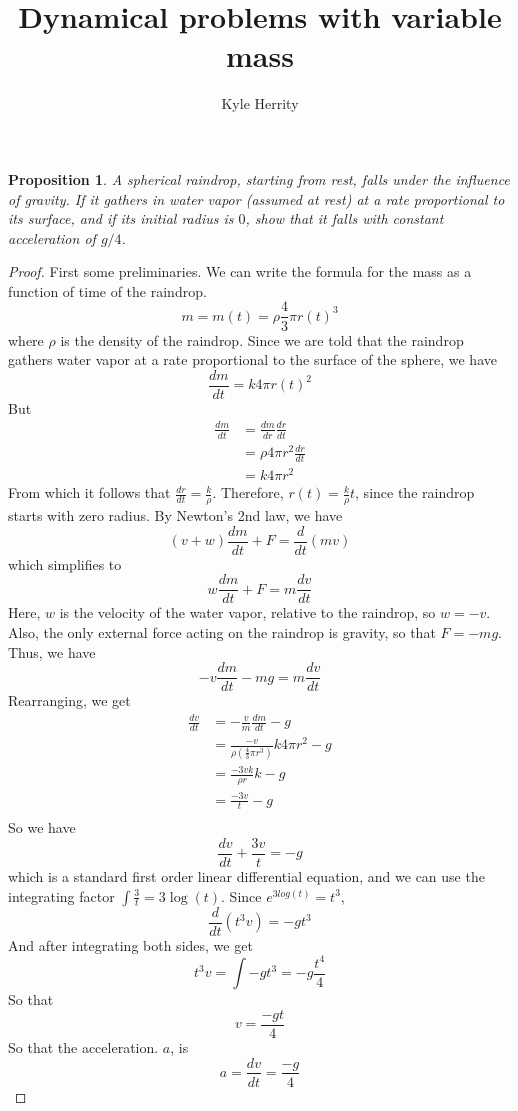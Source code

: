 \documentclass[11pt]{article}
\theoremstyle{plain}
\newtheorem{proposition}{Proposition}
\theoremstyle{definition}
\begin{document}
 
\title{Dynamical problems with variable mass}
\author{Kyle Herrity}
\maketitle

\begin{proposition}
 A spherical raindrop, starting from rest, falls under the influence of gravity. If it gathers in water vapor (assumed at rest) at a rate proportional to its surface, and if its initial radius is $0$, show that it falls with constant acceleration of $g/4$.
\end{proposition}
\begin{proof}
First some preliminaries. We can write the formula for the mass as a function of time of the raindrop.
\[ m = m(t) = \rho \frac{4}{3}\pi r(t)^3 \]
where $\rho$ is the density of the raindrop. Since we are told that the raindrop gathers water vapor at a rate proportional to the surface of the sphere, we have
\[ \frac{dm}{dt} = k 4\pi r(t)^2 \]
But
\begin{align} 
\frac{dm}{dt} &= \frac{dm}{dr}\frac{dr}{dt}\\
              &= \rho 4 \pi r^2 \frac{dr}{dt}\\
              &= k4\pi r^2
\end{align}
From which it follows that $\frac{dr}{dt} = \frac{k}{\rho}$. Therefore, $r(t) = \frac{k}{\rho}t$, since the raindrop starts with zero radius.
By Newton's 2nd law, we have
\[ (v + w)\frac{dm}{dt} + F = \frac{d}{dt}(mv) \]
which simplifies to 
\[  w\frac{dm}{dt} + F = m\frac{dv}{dt} \]
Here, $w$ is the velocity of the water vapor, relative to the raindrop, so $w = -v$. Also, the only external force acting on the raindrop is gravity, so that $F = -mg$. Thus, we have
\[  -v\frac{dm}{dt} - mg = m\frac{dv}{dt} \]
Rearranging, we get
\begin{align}
\frac{dv}{dt} &= -\frac{v}{m}\frac{dm}{dt} - g\\
              &= \frac{-v}{\rho(\frac{4}{3}\pi r^3)}k 4\pi r^2 - g\\
              &= \frac{-3vk}{\rho r}k - g\\
              &= \frac{-3v}{t} - g\\
\end{align}
So we have
\[ \frac{dv}{dt} + \frac{3v}{t} = -g \]
which is a standard first order linear differential equation, and we can use the integrating factor $\int \frac{3}{t} = 3\log(t)$.
Since $e^{3 log(t)} = t^3$,
\[ \frac{d}{dt}(t^3v) = -gt^3 \]
And after integrating both sides, we get
\[ t^3v = \int -gt^3 = -g\frac{t^4}{4} \]
So that
\[ v = \frac{-gt}{4} \]
So that the acceleration. $a$, is
\[ a = \frac{dv}{dt} = \frac{-g}{4} \]
\end{proof}
 
\end{document}
